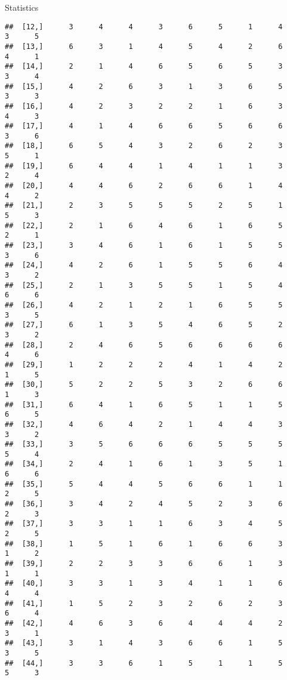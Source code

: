 \documentclass[
  ignorenonframetext,
]{beamer}
\begin{document}
\begin{frame}[fragile]{Statistics}
\begin{verbatim}
##  [12,]      3      4      4      3      6      5      1      4      3      5
##  [13,]      6      3      1      4      5      4      2      6      4      1
##  [14,]      2      1      4      6      5      6      5      3      3      4
##  [15,]      4      2      6      3      1      3      6      5      3      3
##  [16,]      4      2      3      2      2      1      6      3      4      3
##  [17,]      4      1      4      6      6      5      6      6      3      6
##  [18,]      6      5      4      3      2      6      2      3      5      1
##  [19,]      6      4      4      1      4      1      1      3      2      4
##  [20,]      4      4      6      2      6      6      1      4      4      2
##  [21,]      2      3      5      5      5      2      5      1      5      3
##  [22,]      2      1      6      4      6      1      6      5      2      1
##  [23,]      3      4      6      1      6      1      5      5      3      6
##  [24,]      4      2      6      1      5      5      6      4      3      2
##  [25,]      2      1      3      5      5      1      5      4      6      6
##  [26,]      4      2      1      2      1      6      5      5      3      5
##  [27,]      6      1      3      5      4      6      5      2      3      2
##  [28,]      2      4      6      5      6      6      6      6      4      6
##  [29,]      1      2      2      2      4      1      4      2      1      5
##  [30,]      5      2      2      5      3      2      6      6      1      3
##  [31,]      6      4      1      6      5      1      1      5      6      5
##  [32,]      4      6      4      2      1      4      4      3      3      2
##  [33,]      3      5      6      6      6      5      5      5      5      4
##  [34,]      2      4      1      6      1      3      5      1      6      6
##  [35,]      5      4      4      5      6      6      1      1      2      5
##  [36,]      3      4      2      4      5      2      3      6      2      3
##  [37,]      3      3      1      1      6      3      4      5      2      5
##  [38,]      1      5      1      6      1      6      6      3      1      2
##  [39,]      2      2      3      3      6      6      1      3      1      1
##  [40,]      3      3      1      3      4      1      1      6      4      4
##  [41,]      1      5      2      3      2      6      2      3      6      4
##  [42,]      4      6      3      6      4      4      4      2      3      1
##  [43,]      3      1      4      3      6      6      1      5      3      5
##  [44,]      3      3      6      1      5      1      1      5      5      3

\end{verbatim}
\end{frame}
\end{document}
